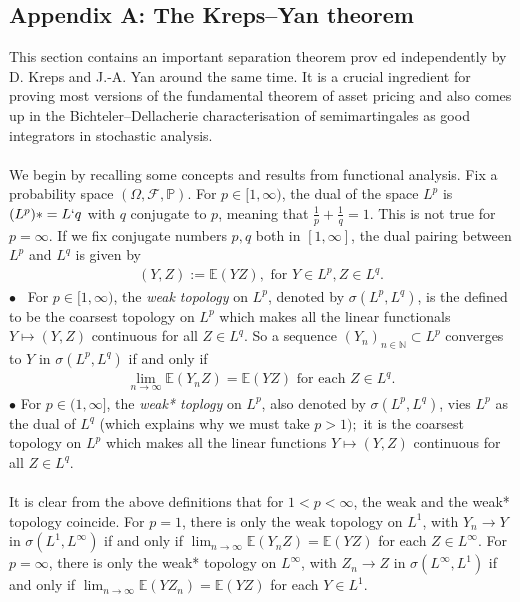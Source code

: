 \documentclass[12pt,a4paper, twoside]{article}
\theoremstyle{definition}
\newcommand{\EE}{\mathbb{E}} %
\newcommand{\PP}{\mathbb{P}} %
\begin{document}
\subsection{Appendix A: The Kreps–Yan theorem}
This section contains an important separation theorem prov
ed independently by D. Kreps
and J.-A. Yan around the same time. It is a crucial ingredient
for proving most versions
of the fundamental theorem of asset pricing and also comes up
in the Bichteler–Dellacherie
characterisation of semimartingales as good integrators in stochastic analysis.
\\\\
We begin by recalling some concepts and results from functional analysis. Fix a probability space $( \Omega, \mathcal{F}, \PP)$. For $p \in [1, \infty)$, the dual of the space $L^p$ is $(L^p)*=L`q$ with $q$ conjugate to $p$, meaning that $\frac{1}{p}+ \frac{1}{q}=1$. This is not true for $p= \infty$. If we fix conjugate numbers $p,q$ both in $[1,  \infty]$, the dual pairing between $L^p$ and $L^q$ is given by 
\begin{align*}
(Y,Z):= \EE(YZ), \text{ for } Y \in L^p,  Z \in L^q.
\end{align*}
$\bullet$ \ For $p \in [1, \infty)$, the \textit{weak topology} on $L^p$, denoted by $\sigma(L^p, L^q)$, is the defined to be the coarsest topology on $L^p$ which makes all the linear functionals $Y \mapsto (Y,Z)$ continuous for all $Z \in L^q$. So a sequence $(Y_n)_{n \in \mathbb{N}} \subset L^p$ converges to $Y$ in $\sigma(L^p,  L^q)$ if and only if  
\begin{align*}
\lim_{n \to \infty} \EE(Y_n Z)= \EE(YZ) \text{ for each } Z \in L^q.
\end{align*}
$\bullet$  For $p \in (1, \infty]$, the \textit{weak* toplogy} on $L^p$, also denoted by $\sigma(L^p, L^q)$, vies $L^p$ as the dual of $L^q$ (which explains why we must take $p>1);$ it is the coarsest topology on $L^p$ which makes all the linear functions $Y \mapsto (Y,Z)$ continuous for all $Z \in L^q$. \\
\\
It is clear from the above definitions that for $1<p< \infty$, the weak and the weak* topology coincide. For $p=1$, there is only the weak topology on $L^1$, with $Y_n \to Y$ in $\sigma(L^1, L^\infty)$ if and only if $\lim_{n \to \infty} \EE(Y_n Z) = \EE(YZ)$ for each $Z \in L^\infty$. For $p= \infty$, there is only the weak* topology on $L^\infty$, with $Z_n \to Z$ in $\sigma(L^\infty,  L^1)$ if and only if $\lim_{n \to \infty} \EE(Y Z_n)= \EE(YZ)$ for each $Y \in L^1$. 
\end{document}
